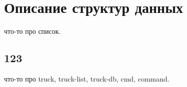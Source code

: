 \section*{Описание структур данных}


что-то про список.

\subsection*{123}

что-то про truck, truck-list, truck-db, cmd, command.